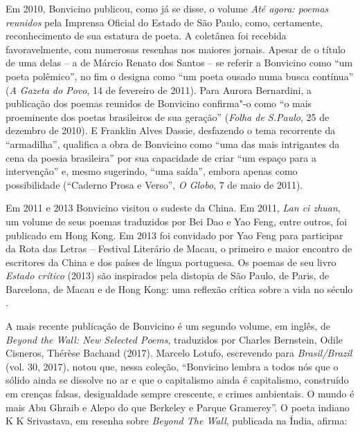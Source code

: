 Em 2010, Bonvicino publicou, como já se disse, o volume \emph{Até agora:
poemas reunidos} pela Imprensa Oficial do Estado de São Paulo, como,
certamente, reconhecimento de sua estatura de poeta. A coletânea foi
recebida favoravelmente, com numerosas resenhas nos maiores jornais.
Apesar de o título de uma delas -- a de Márcio Renato dos Santos -- se
referir a Bonvicino como ``um poeta polêmico'', no fim o designa como
``um poeta ousado numa busca contínua'' (\emph{A Gazeta do Povo}, 14 de
fevereiro de 2011). Para Aurora Bernardini, a publicação dos poemas
reunidos de Bonvicino confirma"-o como ``o mais proeminente dos poetas
brasileiros de sua geração'' (\emph{Folha de S.Paulo}, 25 de dezembro de
2010). E Franklin Alves Dassie, desfazendo o tema recorrente da
``armadilha'', qualifica a obra de Bonvicino como ``uma das mais
intrigantes da cena da poesia brasileira'' por sua capacidade de criar
``um espaço para a intervenção'' e, mesmo sugerindo, ``uma saída'',
embora apenas como possibilidade (``Caderno Prosa e Verso'', \emph{O
Globo}, 7 de maio de 2011).

Em 2011 e 2013 Bonvicino visitou o sudeste da China. Em 2011, \emph{Lan
ci zhuan}, um volume de seus poemas traduzidos por Bei Dao e Yao Feng,
entre outros, foi publicado em Hong Kong. Em 2013 foi convidado por Yao
Feng para participar da Rota das Letras -- Festival Literário de Macau,
o primeiro e maior encontro de escritores da China e dos países de
língua portuguesa. Os poemas de seu livro \emph{Estado crítico} (2013)
são inspirados pela distopia de São Paulo, de Paris, de Barcelona, de
Macau e de Hong Kong: uma reflexão crítica sobre a vida no século .

A mais recente publicação de Bonvicino é um segundo volume, em inglês,
de \emph{Beyond the Wall: New Selected Poems}, traduzidos por Charles
Bernstein, Odile Cisneros, Thérèse Bachand (2017). Marcelo Lotufo,
escrevendo para \emph{Brasil/Brazil} (vol. 30, 2017), notou que, nessa
coleção, ``Bonvicino lembra a todos nós que o sólido ainda se dissolve
no ar e que o capitalismo ainda é capitalismo, construído em crenças
falsas, desigualdade sempre crescente, e crimes ambientais. O mundo é
mais Abu Ghraib e Alepo do que Berkeley e Parque Gramerey''. O poeta
indiano K K Srivastava, em resenha sobre \emph{Beyond The Wall},
publicada na Índia, afirma:

